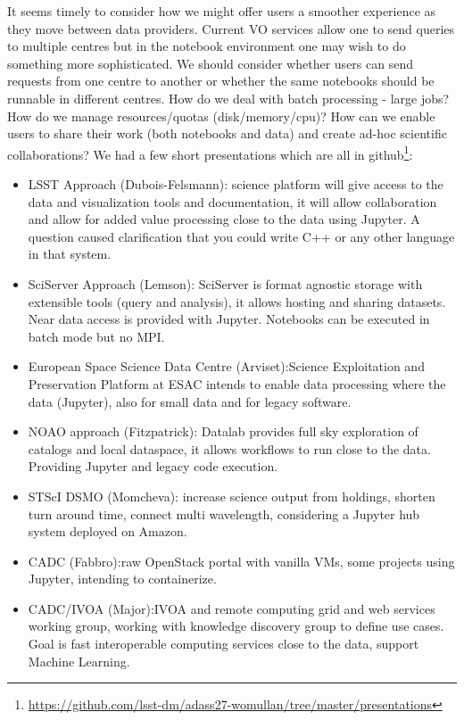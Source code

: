 \documentclass[11pt,twoside]{article}
\begin{document}
It seems timely to consider how we might offer users a smoother experience as they move between data providers.
Current VO services allow one to send queries to multiple centres but in the notebook environment one may wish to do something more sophisticated. We should consider whether users can send requests from one centre to another or whether the same notebooks should be runnable in different centres.
How do we deal with batch processing - large jobs? How do we manage resources/quotas (disk/memory/cpu)?  How can we enable users to share their work (both notebooks and data) and create ad-hoc scientific collaborations?
We had a few short presentations which are all in github\footnote{\url{https://github.com/lsst-dm/adass27-womullan/tree/master/presentations}}:
\begin{itemize}
\item LSST Approach (Dubois-Felsmann): science platform will give access to the data and visualization tools and documentation, it will allow collaboration and allow for added value processing close to the data using Jupyter. A question caused clarification that you could write C++ or any other language in that system.

\item SciServer Approach (Lemson): SciServer is format agnostic storage with extensible tools (query and analysis), it allows hosting and sharing datasets. Near data access is provided with Jupyter. Notebooks can be executed in batch mode but no MPI.

\item European Space Science Data Centre (Arviset):Science Exploitation and Preservation Platform at ESAC
intends to enable data processing where the data (Jupyter), also for small data and for legacy software.

\item NOAO approach (Fitzpatrick): Datalab provides full sky exploration of catalogs and local dataspace, it allows workflows to run close to the data. Providing Jupyter and legacy code execution.

\item STScI DSMO (Momcheva): increase science output from holdings, shorten turn around time, connect multi wavelength, considering a Jupyter hub system deployed on Amazon.

\item CADC (Fabbro):raw OpenStack portal with vanilla VMs, some projects using Jupyter, intending  to containerize.

\item CADC/IVOA (Major):IVOA and remote computing
grid and web services working group, working with knowledge discovery group to define use cases.
Goal is fast interoperable computing services close to the data, support Machine Learning.
\end{itemize}
\end{document}
